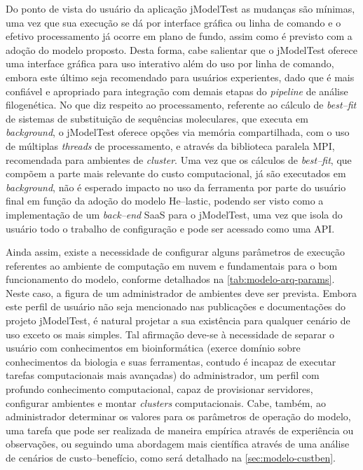 \documentclass[english,brazilian]{UNISINOSmonografia} %
\begin{document}
Do ponto de vista do usuário da aplicação jModelTest as mudanças são mínimas, uma vez que sua execução se dá por interface gráfica ou linha de comando e o efetivo processamento já ocorre em plano de fundo, assim como é previsto com a adoção do modelo proposto.
Desta forma, cabe salientar que o jModelTest oferece uma interface gráfica para uso interativo além do uso por linha de comando, embora este último seja recomendado para usuários experientes, dado que é mais confiável e apropriado para integração com demais etapas do \textit{pipeline} de análise filogenética.
No que diz respeito ao processamento, referente ao cálculo de \textit{best--fit} de sistemas de substituição de sequências moleculares, que executa em \textit{background}, o jModelTest oferece opções via memória compartilhada, com o uso de múltiplas \textit{threads} de processamento, e através da biblioteca paralela MPI, recomendada para ambientes de \textit{cluster}.
Uma vez que os cálculos de \textit{best--fit}, que compõem a parte mais relevante do custo computacional, já são executados em \textit{background}, não é esperado impacto no uso da ferramenta por parte do usuário final em função da adoção do modelo \textsf{He}--lastic, podendo ser visto como a implementação de um \textit{back--end} SaaS para o jModelTest, uma vez que isola do usuário todo o trabalho de configuração e pode ser acessado como uma API.



Ainda assim, existe a necessidade de configurar alguns parâmetros de execução referentes ao ambiente de computação em nuvem e fundamentais para o bom funcionamento do modelo, conforme detalhados na \autoref{tab:modelo-arq-params}.
Neste caso, a figura de um administrador de ambientes deve ser prevista.
Embora este perfil de usuário não seja mencionado nas publicações e documentações do projeto jModelTest, é natural projetar a sua existência para qualquer cenário de uso exceto os mais simples.
Tal afirmação deve-se à necessidade de separar o usuário com conhecimentos em bioinformática (exerce domínio sobre conhecimentos da biologia e suas ferramentas, contudo é incapaz de executar tarefas computacionais mais avançadas) do administrador, um perfil com profundo conhecimento computacional, capaz de provisionar servidores, configurar ambientes e montar \textit{clusters} computacionais.
%
Cabe, também, ao administrador determinar os valores para os parâmetros de operação do modelo, uma tarefa que pode ser realizada de maneira empírica através de experiência ou observações, ou seguindo uma abordagem mais científica através de uma análise de cenários de custo--benefício, como será detalhado na \autoref{sec:modelo-custben}.
\end{document}
